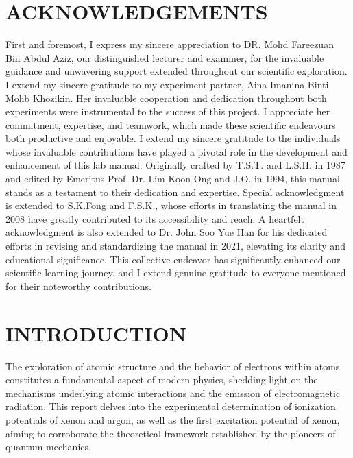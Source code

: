 \documentclass[a4paper,11pt]{article}
\begin{document}
\section*{\large \center ACKNOWLEDGEMENTS}
\label{sec:ACKNOWLEDGEMENTS}
\quad First and foremost, I express my sincere appreciation to DR. Mohd Fareezuan Bin Abdul Aziz, our distinguished lecturer and examiner, for the invaluable guidance and unwavering support extended throughout our scientific exploration. I extend my sincere gratitude to my experiment partner, Aina Imanina Binti Mohb Khozikin. Her invaluable cooperation and dedication throughout both experiments were instrumental to the success of this project. I appreciate her commitment, expertise, and teamwork, which made these scientific endeavours both productive and enjoyable. I extend my sincere gratitude to the individuals whose invaluable contributions have played a pivotal role in the development and enhancement of this lab manual. Originally crafted by T.S.T. and L.S.H. in 1987 and edited by Emeritus Prof. Dr. Lim Koon Ong and J.O. in 1994, this manual stands as a testament to their dedication and expertise. Special acknowledgment is extended to S.K.Fong and F.S.K., whose efforts in translating the manual in 2008 have greatly contributed to its accessibility and reach. A heartfelt acknowledgment is also extended to Dr. John Soo Yue Han for his dedicated efforts in revising and standardizing the manual in 2021, elevating its clarity and educational significance. This collective endeavor has significantly enhanced our scientific learning journey, and I extend genuine gratitude to everyone mentioned for their noteworthy contributions.

\newpage
\renewcommand{\contentsname}{\centering CONTENTS}
\renewcommand{\cftsecleader}{\cftdotfill{\cftdotsep}} %
\renewcommand{\cftdotsep}{1.0} %
\tableofcontents
{}
{}
\label{sec:CONTENTS}

\newpage
{}
{}
\label{sec:LIST OF TABLES}
\listoftables

\newpage
{}
{}
\label{sec:LIST OF FIGURES}
\listoffigures

\newpage
{}
\section*{\center INTRODUCTION}
\label{sec:INTRODUCTION}
\quad The exploration of atomic structure and the behavior of electrons within atoms constitutes a fundamental aspect of modern physics, shedding light on the mechanisms underlying atomic interactions and the emission of electromagnetic radiation. This report delves into the experimental determination of ionization potentials of xenon and argon, as well as the first excitation potential of xenon, aiming to corroborate the theoretical framework established by the pioneers of quantum mechanics.\\
\end{document}
